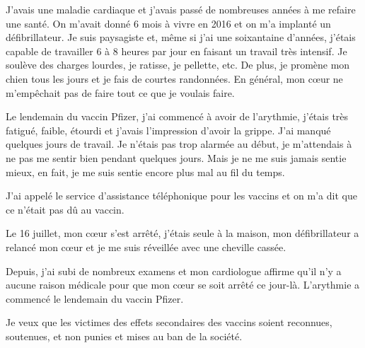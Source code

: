J'avais une maladie cardiaque et j'avais passé de nombreuses années à me refaire
une santé. On m'avait donné 6 mois à vivre en 2016 et on m'a implanté un
défibrillateur. Je suis paysagiste et, même si j'ai une soixantaine d'années,
j'étais capable de travailler 6 à 8 heures par jour en faisant un travail très
intensif. Je soulève des charges lourdes, je ratisse, je pellette, etc. De plus,
je promène mon chien tous les jours et je fais de courtes randonnées. En
général, mon cœur ne m'empêchait pas de faire tout ce que je voulais faire.

Le lendemain du vaccin Pfizer, j'ai commencé à avoir de l'arythmie, j'étais très
fatigué, faible, étourdi et j'avais l'impression d'avoir la grippe. J'ai manqué
quelques jours de travail. Je n'étais pas trop alarmée au début, je m'attendais
à ne pas me sentir bien pendant quelques jours. Mais je ne me suis jamais sentie
mieux, en fait, je me suis sentie encore plus mal au fil du temps.

J'ai appelé le service d'assistance téléphonique pour les vaccins et on m'a dit
que ce n'était pas dû au vaccin.

Le 16 juillet, mon cœur s'est arrêté, j'étais seule à la maison, mon
défibrillateur a relancé mon cœur et je me suis réveillée avec une cheville
cassée.

Depuis, j'ai subi de nombreux examens et mon cardiologue affirme qu'il n'y a
aucune raison médicale pour que mon cœur se soit arrêté ce jour-là. L'arythmie a
commencé le lendemain du vaccin Pfizer.

Je veux que les victimes des effets secondaires des vaccins soient reconnues,
soutenues, et non punies et mises au ban de la société.
